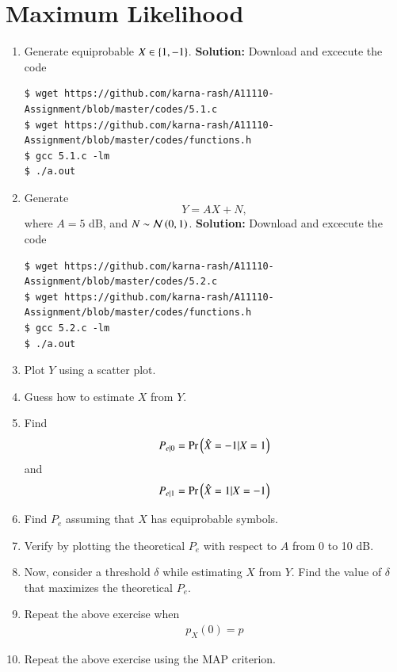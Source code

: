\documentclass[journal,12pt,twocolumn]{IEEEtran}
\renewcommand\thesection{\arabic{section}}
\begin{document}
\section{Maximum Likelihood}
\begin{enumerate}[label=\thesection.\arabic*
,ref=\thesection.\theenumi]
\item Generate equiprobable $X \in \left\{1,-1\right\}$.
\textbf{Solution:}
	Download and excecute the code
	\begin{lstlisting}
$ wget https://github.com/karna-rash/A11110-Assignment/blob/master/codes/5.1.c
$ wget https://github.com/karna-rash/A11110-Assignment/blob/master/codes/functions.h
$ gcc 5.1.c -lm 
$ ./a.out 
	\end{lstlisting}
\item Generate 
\begin{equation}
Y = AX+N,
\end{equation}
		where $A = 5$ dB,  and $N \sim \mathcal{N}\left(0,1\right)$.
		\textbf{Solution:}
	Download and excecute the code
	\begin{lstlisting}
$ wget https://github.com/karna-rash/A11110-Assignment/blob/master/codes/5.2.c
$ wget https://github.com/karna-rash/A11110-Assignment/blob/master/codes/functions.h
$ gcc 5.2.c -lm 
$ ./a.out 
	\end{lstlisting}
	\item Plot $Y$ using a scatter plot.
	\item Guess how to estimate $X$ from $Y$.
\item
\label{ml-ch4_sim}
Find 
\begin{equation}
	P_{e|0} = \Pr\left(\hat{X} = -1|X=1\right)
\end{equation}
and 
\begin{equation}
	P_{e|1} = \Pr\left(\hat{X} = 1|X=-1\right)
\end{equation}
%
\item Find $P_e$ assuming that $X$ has equiprobable symbols.
%
\item
Verify by plotting  the theoretical $P_e$ with respect to $A$ from 0 to 10 dB.  
%
\item Now, consider a threshold $\delta$  while estimating $X$ from $Y$. Find the value of $\delta$ that maximizes the theoretical $P_e$.
\item Repeat the above exercise when 
	\begin{align}
		p_{X}(0) = p
	\end{align}
\item Repeat the above exercise using the MAP criterion.
		\end{enumerate}
\end{document}
